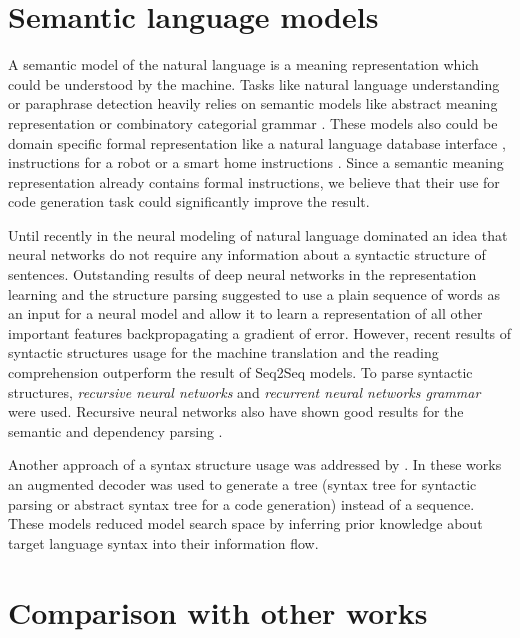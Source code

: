 \section{Semantic language models}
A semantic model of the natural language is a meaning representation which could be understood by the machine. Tasks like natural language understanding or paraphrase detection heavily relies on semantic models like abstract meaning representation \parencite{banarescu2013abstract} or combinatory categorial grammar \parencite{Clark2007}. These models also could be domain specific formal representation like a natural language database interface \parencite{Zettlemoyer2012, berant2013semantic}, instructions for a robot \parencite{artzi2013weakly} or a smart home instructions \parencite{quirk2015language}. Since a semantic meaning representation already contains formal instructions, we believe that their use for code generation task could significantly improve the result.

Until recently in the neural modeling of natural language dominated an idea that neural networks do not require any information about a syntactic structure of sentences. Outstanding results of deep neural networks in the representation learning and the structure parsing suggested to use a plain sequence of words as an input for a neural model and allow it to learn a representation of all other important features backpropagating a gradient of error. However, recent results of syntactic structures usage for the machine translation \parencite{Chen2017} and the reading comprehension \parencite{xie2017constituent} outperform the result of Seq2Seq models. To parse syntactic structures, \emph{recursive neural networks} \parencite{Goller, socher2011parsing} and \emph{recurrent neural networks grammar} \parencite{Dyer2016} were used. Recursive neural networks also have shown good results for the semantic \parencite{Tai2015} and dependency parsing \parencite{Zhu2015}. 

Another approach of a syntax structure usage was addressed by \cite{Dong2016, Yin2017, Rabinovich2017}. In these works an augmented decoder was used to generate a tree (syntax tree for syntactic parsing or abstract syntax tree for a code generation) instead of a sequence. These models reduced model search space by inferring prior knowledge about target language syntax into their information flow.

\section{Comparison with other works}

